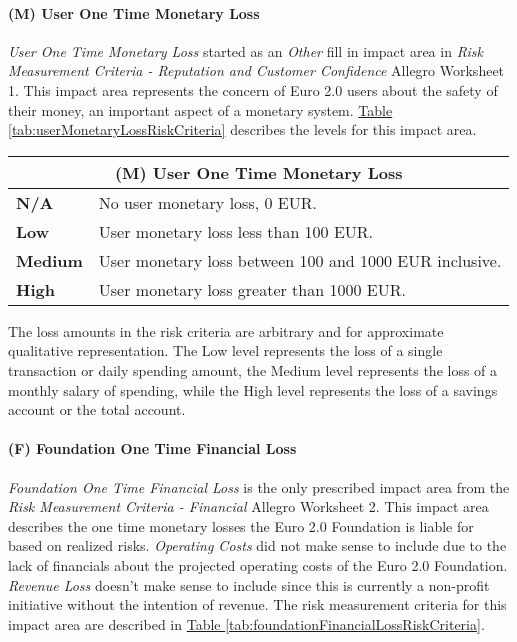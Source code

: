 \documentclass[12pt]{article} %
\newcommand{\hypertableref}[1]{\hyperref[#1]{Table \ref{#1}}}
\begin{document}
{\paragraph{(M) User One Time Monetary Loss}

\textit{User One Time Monetary Loss} started as an \textit{Other} fill in impact area in \textit{Risk Measurement Criteria - Reputation and Customer Confidence} Allegro Worksheet 1. This impact area represents the concern of Euro 2.0 users about the safety of their money, an important aspect of a monetary system. \hypertableref{tab:userMonetaryLossRiskCriteria} describes the levels for this impact area.

\begin{center}
\begin{tabular}{ | l | p{12cm} | }
  \hline
  \multicolumn{2}{|c|}{\textbf{(M) User One Time Monetary Loss}}
  \\ \hline
  \textbf{N/A} & No user monetary loss, 0 EUR.
  \\ \hline
  \textbf{Low} & User monetary loss less than 100 EUR.
  \\ \hline
  \textbf{Medium} & User monetary loss between 100 and 1000 EUR inclusive.
  \\ \hline
  \textbf{High} & User monetary loss greater than 1000 EUR.
  \\ \hline
\end{tabular}
\end{center}
\label{tab:userMonetaryLossRiskCriteria}

The loss amounts in the risk criteria are arbitrary and for approximate qualitative representation. The Low level represents the loss of a single transaction or daily spending amount, the Medium level represents the loss of a monthly salary of spending, while the High level represents the loss of a savings account or the total account.

\paragraph{(F) Foundation One Time Financial Loss}

\textit{Foundation One Time Financial Loss} is the only prescribed impact area from the \textit{Risk Measurement Criteria - Financial} Allegro Worksheet 2. This impact area describes the one time monetary losses the Euro 2.0 Foundation is liable for based on realized risks. \textit{Operating Costs} did not make sense to include due to the lack of financials about the projected operating costs of the Euro 2.0 Foundation. \textit{Revenue Loss} doesn't make sense to include since this is currently a non-profit initiative without the intention of revenue. The risk measurement criteria for this impact area are described in \hypertableref{tab:foundationFinancialLossRiskCriteria}.

}
\end{document}
